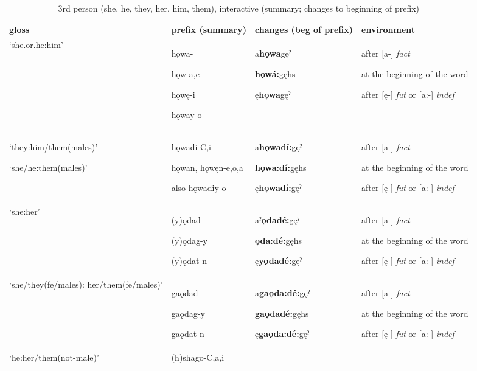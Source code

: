 \begin{table}
\caption{3rd person (she, he, they, her, him, them), interactive (summary; changes to beginning of prefix)}
\label{tab:1:33pron}
\tiny{
\begin{tabularx}{\textwidth}{XXXX}
\lsptoprule
gloss & prefix (summary) & changes (beg of prefix) & environment\\
\midrule
‘she.or.he:him’ & hǫwa-

hǫw-a,e

hǫwę-i

hǫway-o & a\textbf{hǫwa}gęˀ

\textbf{hǫwá:}gęhs

ę\textbf{hǫwa}gęˀ & after [a-] \textit{fact}

at the beginning of the word 

after [ę-] \textit{fut} or [a:-] \textit{indef}\\
‘they:him/them(males)’

‘she/he:them(males)’ & hǫwadi-C,i

hǫwan, hǫwęn-e,o,a

also hǫwadiy-o & a\textbf{hǫwadí:}gęˀ

\textbf{hǫwa:dí:}gęhs

ę\textbf{hǫwadí:}gęˀ & after [a-] \textit{fact}

at the beginning of the word 

after [ę-] \textit{fut} or [a:-] \textit{indef}\\
‘she:her’ & (y)ǫdad-

(y)ǫdag-y

(y)ǫdat-n & aˀ\textbf{ǫdadé:}gęˀ

\textbf{ǫda:dé:}gęhs

ę\textbf{yǫdadé:}gęˀ & after [a-] \textit{fact}

at the beginning of the word 

after [ę-] \textit{fut} or [a:-] \textit{indef}\\
‘she/they(fe/males):
her/them(fe/males)’ & gaǫdad-

gaǫdag-y

gaǫdat-n & a\textbf{gaǫda:dé:}gęˀ

\textbf{gaǫdadé:}gęhs

ę\textbf{gaǫda:dé:}gęˀ & after [a-] \textit{fact}

at the beginning of the word 

after [ę-] \textit{fut} or [a:-] \textit{indef}\\
‘he:her/them(not-male)’ & (h)shago-C,a,i


\end{tabularx}}
\end{table}
